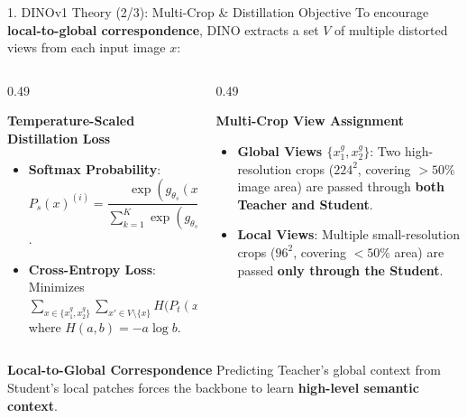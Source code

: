 \documentclass[aspectratio=169,10pt]{beamer}
\begin{document}
\begin{frame}{1. DINOv1 Theory (2/3): Multi-Crop \& Distillation Objective}
\vspace{-0.4em}
To encourage \textbf{local-to-global correspondence}, DINO extracts a set $V$ of multiple distorted views from each input image $x$:

\vspace{0.2em}
\begin{columns}[t]
    \begin{column}{0.49\textwidth}
        \begin{block}{\textbf{Temperature-Scaled Distillation Loss}}
            \small
            \begin{itemize}\setlength{\itemsep}{2pt}
                \item \textbf{Softmax Probability}: $P_s(x)^{(i)} = \dfrac{\exp(g_{\theta_s}(x)^{(i)} / \tau_s)}{\sum_{k=1}^K \exp(g_{\theta_s}(x)^{(k)} / \tau_s)}$.
                \item \textbf{Cross-Entropy Loss}: Minimizes $\sum_{x \in \{x_1^g, x_2^g\}} \sum_{x' \in V \setminus \{x\}} H\big(P_t(x), P_s(x')\big)$ where $H(a,b) = -a \log b$.
            \end{itemize}
        \end{block}
    \end{column}

    \begin{column}{0.49\textwidth}
        \begin{block}{\textbf{Multi-Crop View Assignment}}
            \small
            \begin{itemize}\setlength{\itemsep}{2pt}
                \item \textbf{Global Views $\{x_1^g, x_2^g\}$}: Two high-resolution crops ($224^2$, covering $>50\%$ image area) are passed through \textbf{both Teacher and Student}.
                \item \textbf{Local Views}: Multiple small-resolution crops ($96^2$, covering $<50\%$ area) are passed \textbf{only through the Student}.
            \end{itemize}
        \end{block}
    \end{column}
\end{columns}

\vspace{0.3em}
\begin{exampleblock}{\textbf{Local-to-Global Correspondence}}
    \centering\small
    Predicting Teacher's global context from Student's local patches forces the backbone to learn \textbf{high-level semantic context}.
\end{exampleblock}
\end{frame}
\end{document}
